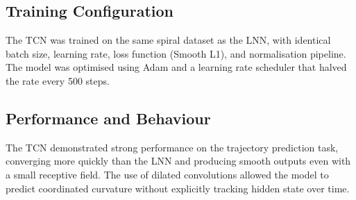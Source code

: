 \subsection*{Training Configuration}
The TCN was trained on the same spiral dataset as the LNN, with identical batch size, learning rate, loss function (Smooth L1), and normalisation pipeline. The model was optimised using Adam and a learning rate scheduler that halved the rate every 500 steps.

\subsection*{Performance and Behaviour}
The TCN demonstrated strong performance on the trajectory prediction task, converging more quickly than the LNN and producing smooth outputs even with a small receptive field. The use of dilated convolutions allowed the model to predict coordinated curvature without explicitly tracking hidden state over time.

